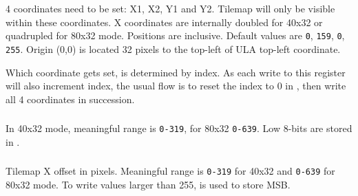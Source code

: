 4 coordinates need to be set: X1, X2, Y1 and Y2. Tilemap will only be visible within these coordinates. X coordinates are internally doubled for 40x32 or quadrupled for 80x32 mode. Positions are inclusive. Default values are {\tt 0}, {\tt 159}, {\tt 0}, {\tt 255}. Origin (0,0) is located 32 pixels to the top-left of ULA top-left coordinate.

Which coordinate gets set, is determined by index. As each write to this register will also increment index, the usual flow is to reset the index to 0 in , then write all 4 coordinates in succession.


\subsubsection{}



\subsubsection{}

\begin{NextPort}
\end{NextPort}

In 40x32 mode, meaningful range is {\tt 0-319}, for 80x32 {\tt 0-639}. Low 8-bits are stored in .


\subsubsection{}

\begin{NextPort}
\end{NextPort}

Tilemap X offset in pixels. Meaningful range is {\tt 0-319} for 40x32 and {\tt 0-639} for 80x32 mode. To write values larger than 255,  is used to store MSB.


\subsubsection{}

